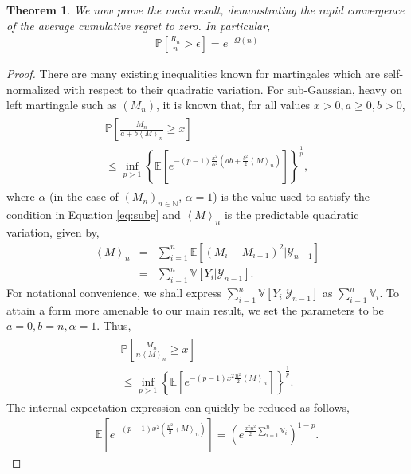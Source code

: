 \documentclass[]{article}
\newcommand{\paren}[1]{\left({#1}\right)}
\newcommand{\brac}[1]{\left[{#1}\right]}
\newcommand{\set}[1]{\left\{{#1}\right\}}
\newcommand{\E}[1]{\mathbb{E}\brac{{#1}}}
\newcommand{\V}[1]{\mathbb{V}\brac{{#1}}}
\renewcommand{\Pr}[1]{\mathbb{P}\brac{{#1}}}
\newcommand{\1}{\mathbf{1}}
\newcommand{\0}{\mathbf{0}}
\newcommand{\ang}[1]{\left\langle{#1}\right\rangle}
\newtheorem{theorem}{Theorem}[section]
\begin{document}
\begin{theorem} 
  	We now prove the main result, demonstrating the rapid convergence of the average cumulative regret to zero. In particular,
  	\begin{eqnarray}
    	\Pr{\frac{R_n}{n} > \epsilon} = e^{-\Omega(n)}
  	\end{eqnarray}
\end{theorem}
\begin{proof}
  	There are many existing inequalities known for martingales which are self-normalized with respect to their quadratic variation. For sub-Gaussian, heavy on left martingale such as $(M_n)$, it is known that, for all values $x > 0, a \geq 0, b > 0$,
  	\begin{eqnarray}
    	\begin{aligned}
      	\Pr{\frac{M_n}{a+b\ang{M}_n} \geq x} \\
      	\leq \inf_{p > 1} \set{\E{e^{-(p-1)\frac{x^2}{\alpha^2}\paren{ab + \frac{b^2}{2}\ang{M}_n}}}}^{\frac{1}{p}},
    	\end{aligned}
  	\end{eqnarray}
  	where $\alpha$ (in the case of $(M_n)_{n \in \mathbb{N}}$, $\alpha = 1$) is the value used to satisfy the condition in Equation \ref{eq:subg} and $\ang{M}_n$ is the predictable quadratic variation, given by,
  	\begin{eqnarray}
    	\ang{M}_n &=& \sum_{i=1}^n \E{\paren{M_i - M_{i-1}}^2 | \mathcal{Y}_{n-1}} \\
        &=& \sum_{i=1}^n \V{Y_i | \mathcal{Y}_{n-1}}. 
  	\end{eqnarray}
  	For notational convenience, we shall express $\sum_{i=1}^n \V{Y_i | \mathcal{Y}_{n-1}}$ as $\sum_{i=1}^n \mathbb{V}_i$. To attain a form more amenable to our main result, we set the parameters to be $a = 0, b=n, \alpha=1$. Thus,
  	\begin{eqnarray}
    	\begin{aligned}
    		\Pr{\frac{M_n}{n\ang{M}_n} \geq x} \\
        	\leq \inf_{p > 1} \set{\E{e^{-(p-1)x^2\frac{n^2}{2}\ang{M}_n}}}^{\frac{1}{p}}.
        \end{aligned} \label{eq:conc}
  	\end{eqnarray}
  	The internal expectation expression can quickly be reduced as follows,
  	\begin{eqnarray}
    	\E{e^{-(p-1)x^2\paren{\frac{n^2}{2}\ang{M}_n}}} = \paren{e^{\frac{x^2n^2}{2}\sum_{i=1}^n \mathbb{V}_i}}^{1-p}.
  	\end{eqnarray}

\end{proof}
\end{document}
